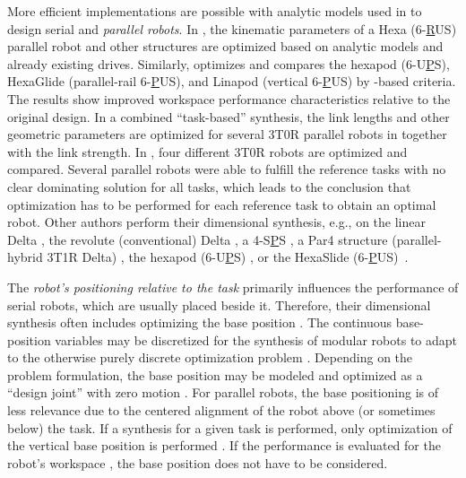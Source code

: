More efficient implementations are possible with analytic models used in \cite{CarboneOttCec2007} to design serial and \emph{parallel robots}.
In \cite{Krefft2006}, the kinematic parameters of a Hexa (6-\underline{R}US) parallel robot and other structures are optimized based on analytic models and already existing drives. Similarly, \cite{Kirchner2000} optimizes and compares the hexapod (6-U\underline{P}S), HexaGlide (parallel-rail 6-\underline{P}US), and Linapod (vertical 6-\underline{P}US) by -based criteria.
The results show improved workspace performance characteristics relative to the original design.
In a combined ``task-based'' synthesis, the link lengths and other geometric parameters are optimized for several 3T0R parallel robots in \cite{Prause2016} together with the link strength.
In \cite{BenHamidaLarMliRom2021}, four different 3T0R robots are optimized and compared.
Several parallel robots were able to fulfill the reference tasks with no clear dominating solution for all tasks, which leads to the conclusion that optimization has to be performed for each reference task to obtain an optimal robot.
Other authors perform their dimensional synthesis, e.g., on the linear Delta \cite{StockMil2003,KelaiaiaComZaa2012}, the revolute (conventional) Delta \cite{Miller2004,LaribiRomZeg2007}, a 4-S\underline{P}S \cite{JamwalHusXie2015}, a Par4 structure (parallel-hybrid 3T1R Delta) \cite{LiuHuaMeiZha2012}, the hexapod (6-U\underline{P}S) \cite{SuDuaZhe2001,Daake2012}, or the HexaSlide (6-\underline{P}US)~\cite{RaoRaoSah2005}.%

%

%
%
%
%


%
%


%
%
%
%
%
%
%
%
%
%
%
%
%
%
%
%
%
%
%
%
%
%
%
%
%
%
%
%
%
%
%
%
%
%
%
%
%
%
%

The \emph{robot's positioning relative to the task} primarily influences the performance of serial robots, which are usually placed beside it.
Therefore, their dimensional synthesis often includes optimizing the base position \cite{SinglaTriRakDas2010,KivelaeMatPuu2017,Ramirez2018,RomitiIacRuzKas2023,BaumgaertnerKanFle2023}.
The continuous base-position variables may be discretized for the synthesis of modular robots to adapt to the otherwise purely discrete optimization problem \cite{RomitiIacRuzKas2023}.
Depending on the problem formulation, the base position may be modeled and optimized as a ``design joint'' with zero motion \cite{BaumgaertnerKanFle2023}.
For parallel robots, the base positioning is of less relevance due to the centered alignment of the robot above {(or sometimes below)} the task.
If a synthesis for a given task is performed, only optimization of the vertical base position is performed \cite{Prause2016}.
If the performance is evaluated for the robot's workspace \cite{Kirchner2000,Krefft2006,Daake2012}, the base position does not have to be considered.

